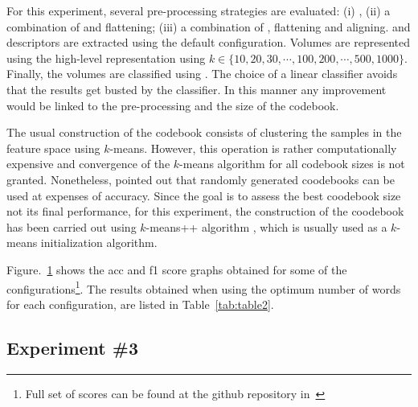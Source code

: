 For this experiment, several pre-processing strategies are evaluated: (i) \nlm, (ii) a combination of \nlm and flattening; (iii) a combination of \nlm, flattening and aligning.
\lbp and \lbptop descriptors are extracted using the default configuration.
Volumes are represented using the high-level representation \bow using $k \in \{10, 20, 30, \cdots, 100, 200, \cdots, 500, 1000\}$.
Finally, the volumes are classified using \lr. The choice of a linear classifier avoids that the results get busted by the classifier. In this manner any improvement would be linked to the pre-processing and the size of the codebook.


The usual construction of the codebook consists of clustering the samples in
the feature space using $k$-means. However, this operation is rather
computationally expensive and convergence of the $k$-means algorithm for all
codebook sizes is not granted.
Nonetheless, \citeauthor{nowak2006sampling} pointed out that randomly generated coodebooks can be used at expenses of accuracy.
Since the goal is to assess the best coodebook size not its final performance, for this experiment, the construction of the coodebook has been carried out using $k$-means++ algorithm , which is usually used as a $k$-means initialization algorithm.

Figure.~\ref{fig:RBOW} shows the \ac{acc} and \ac{f1} score graphs obtained for some of the configurations\footnote{Full set of scores can be found at the github repository in~\cite{Lemaitre2015}}.
The results obtained when using the optimum number of words for each configuration, are listed in Table~\ref{tab:table2}.

\begin{figure}[t]
  \caption{}
  \label{fig:RBOW}
\end{figure}




\subsection{Experiment \#3}\label{subsec:exp3}
%
%
%
%

